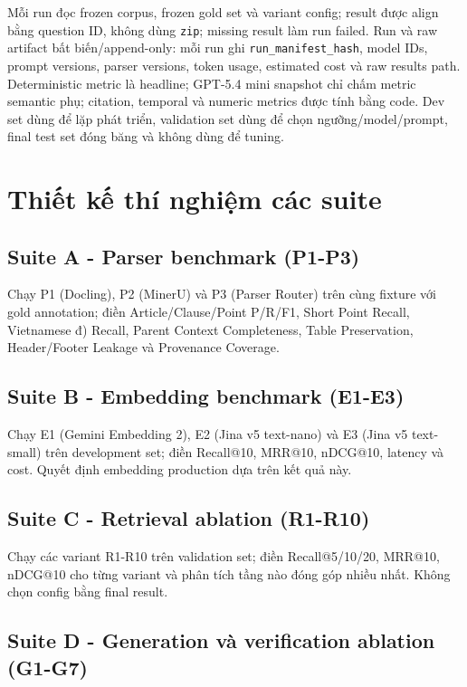 \documentclass[a4paper,12pt]{extreport}
\newif\ifdraftmode
\newcommand{\pendingresult}[1]{%
  \ifdraftmode
  \begin{center}
  \fcolorbox{DraftBorder}{DraftYellow}{%
    \parbox{0.90\textwidth}{\textbf{Nội dung chờ cập nhật:} #1}
  }
  \end{center}
  \else
  #1
  \fi
}
\newcommand{\code}[1]{\texttt{#1}}
\begin{document}
Mỗi run đọc frozen corpus, frozen gold set và variant config; result được align bằng question ID, không dùng \code{zip}; missing result làm run failed. Run và raw artifact bất biến/append-only: mỗi run ghi \code{run\_manifest\_hash}, model IDs, prompt versions, parser versions, token usage, estimated cost và raw results path. Deterministic metric là headline; GPT-5.4 mini snapshot chỉ chấm metric semantic phụ; citation, temporal và numeric metrics được tính bằng code. Dev set dùng để lặp phát triển, validation set dùng để chọn ngưỡng/model/prompt, final test set đóng băng và không dùng để tuning.

\section{Thiết kế thí nghiệm các suite}

\subsection{Suite A - Parser benchmark (P1-P3)}

\pendingresult{Chạy P1 (Docling), P2 (MinerU) và P3 (Parser Router) trên cùng fixture với gold annotation; điền Article/Clause/Point P/R/F1, Short Point Recall, Vietnamese đ) Recall, Parent Context Completeness, Table Preservation, Header/Footer Leakage và Provenance Coverage.}

\subsection{Suite B - Embedding benchmark (E1-E3)}

\pendingresult{Chạy E1 (Gemini Embedding 2), E2 (Jina v5 text-nano) và E3 (Jina v5 text-small) trên development set; điền Recall@10, MRR@10, nDCG@10, latency và cost. Quyết định embedding production dựa trên kết quả này.}

\subsection{Suite C - Retrieval ablation (R1-R10)}

\pendingresult{Chạy các variant R1-R10 trên validation set; điền Recall@5/10/20, MRR@10, nDCG@10 cho từng variant và phân tích tầng nào đóng góp nhiều nhất. Không chọn config bằng final result.}

\subsection{Suite D - Generation và verification ablation (G1-G7)}
\end{document}
